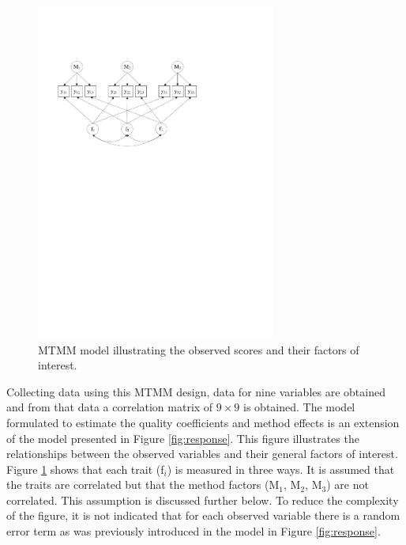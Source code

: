 \documentclass[a4paper,12pt]{article}
\begin{document}
\begin{figure}[htb]\centering
\includegraphics[width=0.7\textwidth]{MTMM}
\caption{\label{fig:mtmm}MTMM model illustrating the observed scores and their factors of interest.}
\end{figure}

Collecting data using this MTMM design, data for nine variables are obtained and from that data a correlation matrix of $9 \times 9$ is obtained. The model formulated to estimate the quality coefficients and method effects is an extension of the model presented in Figure \ref{fig:response}. This figure illustrates the relationships between the observed variables and their general factors of interest. Figure \ref{fig:mtmm} shows that each trait (f$_i$) is measured in three ways. It is assumed that the traits are correlated but that the method factors (M$_1$, M$_2$, M$_3$) are not correlated. This assumption is discussed further below. To reduce the complexity of the figure, it is not indicated that for each observed variable there is a random error term as was previously introduced in the model in Figure \ref{fig:response}. 
\end{document}
